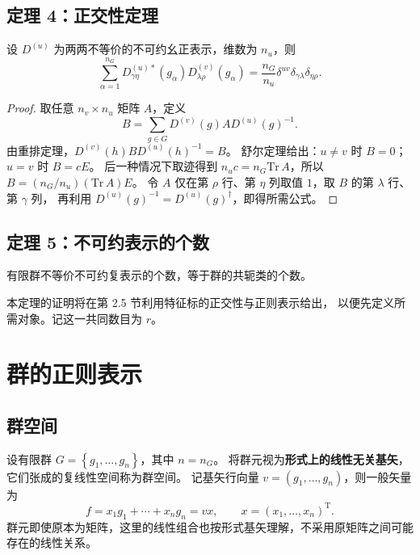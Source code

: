 \subsection{定理 4：正交性定理}
\begin{theorem}[表示矩阵元的正交性]
设 $D^{\left(u\right)}$ 为两两不等价的不可约幺正表示，维数为 $n_u$，则
\begin{equation}
\sum_{\alpha=1}^{n_G}D^{\left(u\right)*}_{\gamma\eta}\left(g_\alpha\right)
D^{\left(v\right)}_{\lambda\rho}\left(g_\alpha\right)
=\frac{n_G}{n_u}\delta^{uv}\delta_{\gamma\lambda}\delta_{\eta\rho}.
\end{equation}
\end{theorem}
\begin{proof}
取任意 $n_v\times n_u$ 矩阵 $A$，定义
\begin{equation}
B=\sum_{g\in G}D^{\left(v\right)}\left(g\right)A D^{\left(u\right)}\left(g\right)^{-1}.
\end{equation}
由重排定理，$D^{\left(v\right)}\left(h\right)B D^{\left(u\right)}\left(h\right)^{-1}=B$。
舒尔定理给出：$u\ne v$ 时 $B=0$；$u=v$ 时 $B=cE$。
后一种情况下取迹得到 $n_uc=n_G\mathrm{Tr}\,A$，所以
$B=\left(n_G/n_u\right)\left(\mathrm{Tr}\,A\right)E$。
令 $A$ 仅在第 $\rho$ 行、第 $\eta$ 列取值 $1$，取 $B$ 的第 $\lambda$ 行、第 $\gamma$ 列，
再利用 $D^{\left(u\right)}\left(g\right)^{-1}=D^{\left(u\right)}\left(g\right)^\dagger$，即得所需公式。
\end{proof}

\subsection{定理 5：不可约表示的个数}
\begin{theorem}
有限群不等价不可约复表示的个数，等于群的共轭类的个数。
\end{theorem}
本定理的证明将在第 2.5 节利用特征标的正交性与正则表示给出，
以便先定义所需对象。记这一共同数目为 $r$。

\section{群的正则表示}
\subsection{群空间}
设有限群 $G=\left\{g_1,\ldots,g_n\right\}$，其中 $n=n_G$。
将群元视为\textbf{形式上的线性无关基矢}，它们张成的复线性空间称为群空间。
记基矢行向量 $v=\left(g_1,\ldots,g_n\right)$，则一般矢量为
\begin{equation}
f=x_1g_1+\cdots+x_ng_n=vx,\qquad x=\left(x_1,\ldots,x_n\right)^{\mathrm{T}}.
\end{equation}
群元即使原本为矩阵，这里的线性组合也按形式基矢理解，不采用原矩阵之间可能存在的线性关系。

